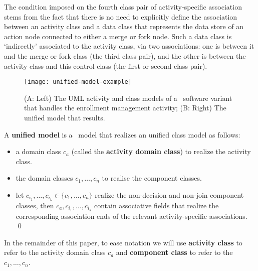 The condition imposed on the fourth class pair of activity-specific association stems from the fact that there is no need to explicitly define the association between an activity class and a data class that represents the data store of an action node connected to either a merge or fork node. Such a data class is `indirectly' associated to the activity class, via two associations: one is between it and the merge or fork class (the third class pair), and the other is between the activity class and this control class (the first or second class pair).

\begin{figure*}[ht]
	\begin{center}
		\texttt{[image: unified-model-example]}
	\end{center}
	\caption{(A: Left) The UML activity and class models of a \courseman~software variant that handles the enrollment management activity; (B: Right) The unified model that results.} %
	\label{fig:unified-model-example}
\end{figure*} 

\begin{definition} \label{def:unified-model}
	A \textbf{unified model} is a \dcsl~model that realizes an unified class model as follows:
	\begin{itemize}%
		\item a domain class $ c_a $ (called the \textbf{activity domain class}) to realize the activity class.
		\item the domain classes $ c_1,\dots,c_n $ to realise the component classes.
		\item let $ c_{i_1},\dots,c_{i_k} \in \{c_1,\dots,c_n\} $ realize the non-decision and non-join component classes, then $ c_a,c_{i_1},\dots,c_{i_k} $ contain associative fields that realize the corresponding association ends of the relevant activity-specific associations. \qed
	\end{itemize}
\end{definition}

In the remainder of this paper, to ease notation we will use \textbf{activity class} to refer to the activity domain class $ c_a $ and \textbf{component class} to refer to the $ c_1,\dots,c_n $. 
%
